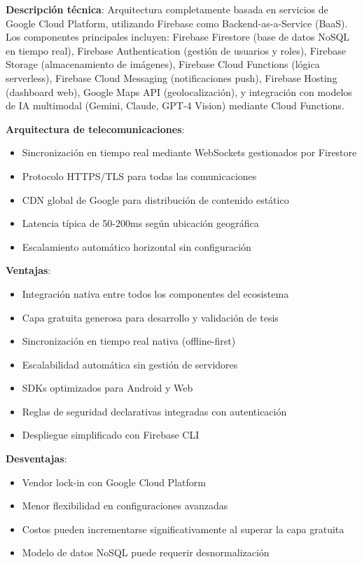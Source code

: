 \textbf{Descripción técnica}: Arquitectura completamente basada en servicios de Google Cloud Platform, utilizando Firebase como Backend-as-a-Service (BaaS). Los componentes principales incluyen: Firebase Firestore (base de datos NoSQL en tiempo real), Firebase Authentication (gestión de usuarios y roles), Firebase Storage (almacenamiento de imágenes), Firebase Cloud Functions (lógica serverless), Firebase Cloud Messaging (notificaciones push), Firebase Hosting (dashboard web), Google Maps API (geolocalización), y integración con modelos de IA multimodal (Gemini, Claude, GPT-4 Vision) mediante Cloud Functions.

\textbf{Arquitectura de telecomunicaciones}:
\begin{itemize}
    \item Sincronización en tiempo real mediante WebSockets gestionados por Firestore
    \item Protocolo HTTPS/TLS para todas las comunicaciones
    \item CDN global de Google para distribución de contenido estático
    \item Latencia típica de 50-200ms según ubicación geográfica
    \item Escalamiento automático horizontal sin configuración
\end{itemize}

\textbf{Ventajas}:
\begin{itemize}
    \item Integración nativa entre todos los componentes del ecosistema
    \item Capa gratuita generosa para desarrollo y validación de tesis
    \item Sincronización en tiempo real nativa (offline-first)
    \item Escalabilidad automática sin gestión de servidores
    \item SDKs optimizados para Android y Web
    \item Reglas de seguridad declarativas integradas con autenticación
    \item Despliegue simplificado con Firebase CLI
\end{itemize}

\textbf{Desventajas}:
\begin{itemize}
    \item Vendor lock-in con Google Cloud Platform
    \item Menor flexibilidad en configuraciones avanzadas
    \item Costos pueden incrementarse significativamente al superar la capa gratuita
    \item Modelo de datos NoSQL puede requerir desnormalización
\end{itemize}

